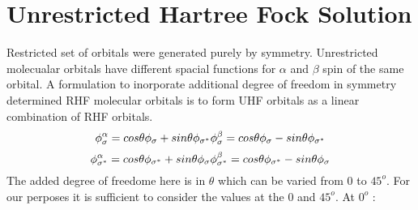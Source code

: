 \documentclass[11pt]{article}   	%
\begin{document}
\section{Unrestricted Hartree Fock Solution}
	Restricted set of orbitals were generated purely by symmetry. Unrestricted molecualar orbitals have different 
	spacial functions for $\alpha$ and $\beta$ spin of the same orbital. A formulation to inorporate additional degree of freedom in symmetry 
	determined RHF molecular orbitals is to form UHF orbitals as a linear combination of RHF orbitals. \\
	\begin{equation}

		\phi_{\sigma}^{\alpha}=cos\theta \phi_{\sigma}+sin\theta \phi_{\sigma^*}\\
		\phi_{\sigma}^{\beta}=cos\theta \phi_{\sigma}-sin\theta \phi_{\sigma^*}\\
	\end{equation}
	\begin{equation}
		\phi_{\sigma^*}^{\alpha}=cos\theta \phi_{\sigma^*}+sin\theta \phi_{\sigma}\\
		\phi_{\sigma^*}^{\beta}=cos\theta \phi_{\sigma^*}-sin\theta \phi_{\sigma}\\
	\end{equation}
	The added degree of freedome here is in $\theta$ which can be varied from 0 to $45^o$. For our perposes it is sufficient to consider the 
	values at the 0 and $45^o$. At $0^o$ :\\
\end{document}
